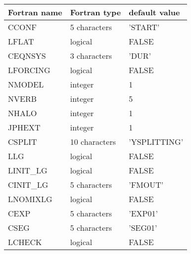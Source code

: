 \begin{center}
\begin{tabular} {|l|l|l|}
\hline
Fortran name & Fortran type & default value \\
\hline
CCONF      &  5 characters  & 'START'  \\
LFLAT      & logical        & FALSE  \\
CEQNSYS    & 3 characters   & 'DUR'    \\
LFORCING   & logical        & FALSE  \\
NMODEL     & integer        & 1      \\
NVERB      & integer        & 5      \\
NHALO      & integer        & 1      \\
JPHEXT     & integer        & 1      \\
CSPLIT     & 10 characters  & 'YSPLITTING' \\
LLG        & logical        & FALSE  \\
LINIT\_LG  & logical        & FALSE  \\
CINIT\_LG  & 5 characters   & 'FMOUT'   \\
LNOMIXLG   & logical        & FALSE  \\
CEXP       & 5 characters   & 'EXP01'  \\
CSEG       & 5 characters   & 'SEG01'  \\
LCHECK     & logical        & FALSE  \\
\hline
\end{tabular}
\end{center}



